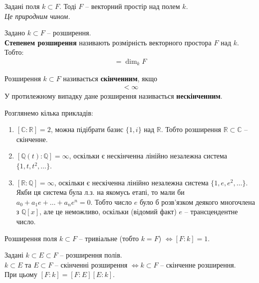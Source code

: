 \documentclass{math_library}
\begin{document}
\begin{proposition}
Задані поля $k \subset F$. Тоді $F$ -- векторний простір над полем $k$.\\
\textit{Це природним чином.}
\end{proposition}

\begin{definition}
Задано $k \subset F$ -- розширення.\\
\textbf{Степенем розширення} називають розмірність векторного простора $F$ над $k$. Тобто:
\begin{align*}
[F : k] = \dim_k F
\end{align*}
\end{definition}

\begin{definition}
Розширення $k \subset F$ називається \textbf{скінченним}, якщо
\begin{align*}
[F:K] < \infty
\end{align*}
У протилежному випадку дане розширення називається \textbf{нескінченним}.
\end{definition}

\begin{example}
Розглянемо кілька прикладів:
\begin{enumerate}[nosep,wide=0pt,label={\arabic*.}]
\item $[\mathbb{C} : \mathbb{R}] = 2$, можна підібрати базис $\{1,i\}$ над $\mathbb{R}$. Тобто розширення $\mathbb{R} \subset \mathbb{C}$ -- скінченне.
\item $[\mathbb{Q}(t) : \mathbb{Q}] = \infty$, оскільки є нескінченна лінійно незалежна система $\{1,t,t^2,\dots\}$.
\item $[\mathbb{R} : \mathbb{Q}] = \infty$, оскільки є нескіченна лінійно незалежна система $\{1,e,e^2,\dots\}$. Якби ця система була л.з. на якомусь етапі, то мали би $a_0 + a_1 e + \dots + a_n e^n = 0$. Тобто число $e$ було б розв'язком деякого многочлена з $\mathbb{Q}[x]$, але це неможливо, оскільки (відомий факт) $e$ -- трансцендентне число.
\end{enumerate}
\end{example}

\begin{remark}
Розширення поля $k \subset F$ -- тривіальне (тобто $k = F$) $\iff [F:k] = 1$.
\end{remark}

\begin{proposition}
Задані $k \subset E \subset F$ -- розширення полів. \\
$k \subset E$ та $E \subset F$ -- скінченні розширення $\iff k \subset F$ -- скінченне розширення. \\
При цьому $[F:k] = [F:E][E:k]$.
\end{proposition}
\end{document}
